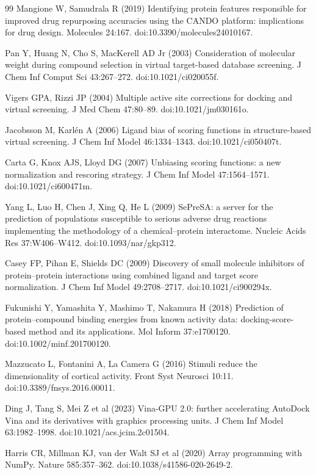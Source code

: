 \begin{thebibliography}{99}
 Mangione W, Samudrala R (2019) Identifying protein
features responsible for improved drug repurposing accuracies using the CANDO
platform: implications for drug design. Molecules 24:167.
doi:10.3390/molecules24010167.

 Pan Y, Huang N, Cho S, MacKerell AD Jr (2003) Consideration of
molecular weight during compound selection in virtual target-based database
screening. J Chem Inf Comput Sci 43:267--272. doi:10.1021/ci020055f.

 Vigers GPA, Rizzi JP (2004) Multiple active site corrections
for docking and virtual screening. J Med Chem 47:80--89. doi:10.1021/jm030161o.

 Jacobsson M, Karl\'en A (2006) Ligand bias of scoring
functions in structure-based virtual screening. J Chem Inf Model 46:1334--1343.
doi:10.1021/ci050407t.

 Carta G, Knox AJS, Lloyd DG (2007) Unbiasing scoring
functions: a new normalization and rescoring strategy. J Chem Inf Model
47:1564--1571. doi:10.1021/ci600471m.

 Yang L, Luo H, Chen J, Xing Q, He L (2009) SePreSA: a
server for the prediction of populations susceptible to serious adverse drug
reactions implementing the methodology of a chemical--protein interactome.
Nucleic Acids Res 37:W406--W412. doi:10.1093/nar/gkp312.

 Casey FP, Pihan E, Shields DC (2009) Discovery of small
molecule inhibitors of protein--protein interactions using combined ligand and
target score normalization. J Chem Inf Model 49:2708--2717.
doi:10.1021/ci900294x.

 Fukunishi Y, Yamashita Y, Mashimo T, Nakamura H (2018)
Prediction of protein--compound binding energies from known activity data:
docking-score-based method and its applications. Mol Inform 37:e1700120.
doi:10.1002/minf.201700120.

 Mazzucato L, Fontanini A, La Camera G (2016) Stimuli
reduce the dimensionality of cortical activity. Front Syst Neurosci 10:11.
doi:10.3389/fnsys.2016.00011.

 Ding J, Tang S, Mei Z et al (2023) Vina-GPU 2.0: further
accelerating AutoDock Vina and its derivatives with graphics processing units.
J Chem Inf Model 63:1982--1998. doi:10.1021/acs.jcim.2c01504.

 Harris CR, Millman KJ, van der Walt SJ et al (2020) Array
programming with NumPy. Nature 585:357--362.
doi:10.1038/s41586-020-2649-2.


\end{thebibliography}
